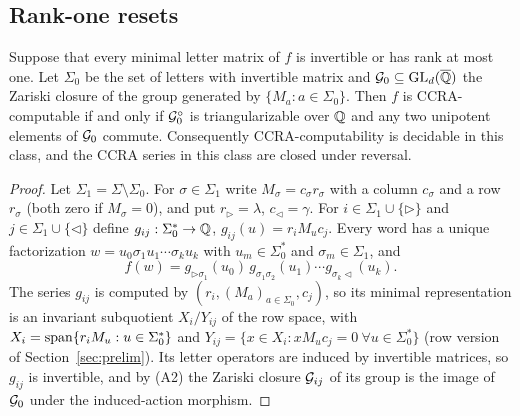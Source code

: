 \subsection{Rank-one resets}
\begin{theorem}\label{thm:rankone}
Suppose that every minimal letter matrix of $f$ is invertible or has rank at most one. Let $\Sigma_0$ be the set of letters with invertible matrix and $\mathcal{G}_0\subseteq\mathrm{GL}_d(\overline{\mathbb{Q}})$ the Zariski closure of the group generated by $\{M_a:a\in\Sigma_0\}$. Then $f$ is CCRA-computable if and only if $\mathcal{G}_0^\circ$ is triangularizable over $\mathbb{Q}$ and any two unipotent elements of $\mathcal{G}_0$ commute. Consequently CCRA-computability is decidable in this class, and the CCRA series in this class are closed under reversal.
\end{theorem}
\begin{proof}
Let $\Sigma_1=\Sigma\setminus\Sigma_0$. For $\sigma\in\Sigma_1$ write $M_\sigma=c_\sigma r_\sigma$ with a column $c_\sigma$ and a row $r_\sigma$ (both zero if $M_\sigma=0$), and put $r_\triangleright=\lambda$, $c_\triangleleft=\gamma$. For $i\in\Sigma_1\cup\{\triangleright\}$ and $j\in\Sigma_1\cup\{\triangleleft\}$ define $g_{ij}:\Sigma_0^*\to\mathbb{Q}$, $g_{ij}(u)=r_iM_uc_j$. Every word has a unique factorization $w=u_0\sigma_1u_1\cdots\sigma_ku_k$ with $u_m\in\Sigma_0^*$ and $\sigma_m\in\Sigma_1$, and
\begin{equation}\label{eq:rankonefactor}
f(w)=g_{\triangleright\sigma_1}(u_0)\,g_{\sigma_1\sigma_2}(u_1)\cdots g_{\sigma_k\triangleleft}(u_k).
\end{equation}
The series $g_{ij}$ is computed by $(r_i,(M_a)_{a\in\Sigma_0},c_j)$, so its minimal representation is an invariant subquotient $X_i/Y_{ij}$ of the row space, with $X_i=\operatorname{span}\{r_iM_u:u\in\Sigma_0^*\}$ and $Y_{ij}=\{x\in X_i:xM_uc_j=0\ \forall u\in\Sigma_0^*\}$ (row version of Section~\ref{sec:prelim}). Its letter operators are induced by invertible matrices, so $g_{ij}$ is invertible, and by (A2) the Zariski closure $\mathcal{G}_{ij}$ of its group is the image of $\mathcal{G}_0$ under the induced-action morphism.


\end{proof}

